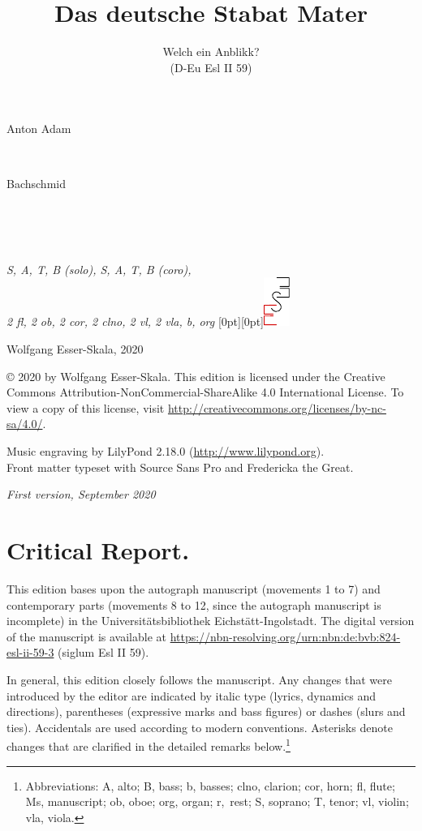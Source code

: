 \documentclass[parskip=full]{scrreprt}
\makeatletter
\DeclareRobustCommand{\sbseries}{\fontseries{sb}\selectfont}
\newcommand\fancytitlehead{
	\headingfont%
	\fontsize{80}{80}\selectfont\textcolor{black!80}{\@ifundefined{@shortname}{\@lastname}{\@shortname}.}\\[15pt]%
	\fontsize{60}{60}\selectfont\@ifundefined{@shorttitle}{\@title}{\@shorttitle}.%
}
\def\firstname#1{\def\@firstname{#1}}
\def\lastname#1{\def\@lastname{#1}}
\def\shorttitle#1{\def\@shorttitle{#1}}
\def\instrumentation#1{\def\@instrumentation{#1}}
\def\maketitle{%
\begin{titlepage}%
	\Large%
	{\@titlehead}%
	\vfill%
	{\strut\@firstname}\\%
	{\sbseries\color{oldred}\strut\@lastname}\\%
	{\strut\@namesuffix}%
	\vfill%
	{\sbseries\@title}\\%
	{\@subtitle}\\[\baselineskip]%
	{\itshape\@instrumentation}%
	\vfill%
	{\itshape\@parts}\hspace*{\fill}\raisebox{0pt}[0pt][0pt]{\includegraphics{ees_logo}}%
\end{titlepage}%
}
\newif\ifprintreport\printreportfalse
\makeatother
\begin{document}
\frenchspacing

\titlehead{\fancytitlehead}
\firstname{Anton Adam}
\lastname{Bachschmid}
\title{Das deutsche Stabat Mater}
\shorttitle{Stabat Mater}
\subtitle{Welch ein Anblikk?\\(D-Eu Esl II 59)}
\instrumentation{S, A, T, B (solo), S, A, T, B (coro),\\2 fl, 2 ob, 2 cor, 2 clno, 2 vl, 2 vla, b, org}
\maketitle


\thispagestyle{empty}

\vspace*{\fill}

\hspace*{1em}Wolfgang Esser-Skala, 2020

© 2020 by Wolfgang Esser-Skala. This edition is licensed under the Creative Commons Attribution-NonCommercial-ShareAlike 4.0 International License. To view a copy of this license, visit \url{http://creativecommons.org/licenses/by-nc-sa/4.0/}. 

Music engraving by LilyPond 2.18.0 (\url{http://www.lilypond.org}).\\
Front matter typeset with Source Sans Pro and Fredericka the Great.

\textit{First version, September 2020}

\vspace*{2cm}

\ifprintreport
\chapter*{Critical Report.}

This edition bases upon the autograph manuscript (movements 1 to 7) and contemporary parts (movements 8 to 12, since the autograph manuscript is incomplete) in the Universitätsbibliothek Eichstätt-Ingolstadt. The digital version of the manuscript is available at \url{https://nbn-resolving.org/urn:nbn:de:bvb:824-esl-ii-59-3} (siglum Esl II 59).

In general, this edition closely follows the manuscript. Any changes that were introduced by the editor are indicated by italic type (lyrics, dynamics and directions), parentheses (expressive marks and bass figures) or dashes (slurs and ties). Accidentals are used according to modern conventions. Asterisks denote changes that are clarified in the detailed remarks below.\footnote{Abbreviations: A, alto; B, bass; b, basses; clno, clarion; cor, horn; fl, flute; Ms, manuscript; ob, oboe; org, organ; r,~rest; S, soprano; T, tenor; vl, violin; vla, viola.}
\end{document}
